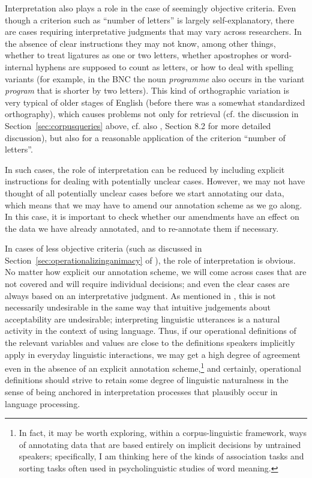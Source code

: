 Interpretation also plays a role in the case of seemingly objective criteria. Even though a criterion such as ``number of letters'' is largely self\hyp{}explanatory, there are cases requiring interpretative judgments that may vary across researchers. In the absence of clear instructions they may not know, among other things, whether to treat ligatures as one or two letters, whether apostrophes or word\hyp{}internal hyphens are supposed to count as letters, or how to deal with spelling variants (for example, in the BNC  the noun  \textit{programme} also occurs in the variant \textit{program} that is shorter by two letters). This kind of orthographic variation  is very typical of older stages of English (before there was a somewhat standardized orthography), which causes problems not only for retrieval  (cf. the discussion in Section~\ref{sec:corpusqueries}  above, cf. also \citet{barnbrook_language_1996}, Section 8.2 for more detailed discussion), but also for a reasonable application of the criterion ``number of letters''.

In such cases, the role of interpretation can be reduced by including explicit instructions for dealing with potentially unclear cases. However, we may not have thought of all potentially unclear cases before we start annotating  our data, which means that we may have to amend our annotation scheme as we go along. In this case, it is important to check whether our amendments have an effect on the data we have already annotated,  and to re\hyp{}annotate them if necessary.

In cases of less objective criteria (such as   discussed in
Section~\ref{sec:operationalizinganimacy} of ), the role of interpretation is obvious. No matter how explicit our annotation  scheme, we will come across cases that are not covered and will require individual decisions; and even the clear cases are always based on an interpretative judgment. As mentioned in , this is not necessarily undesirable in the same way that intuitive  judgements about acceptability  are undesirable; interpreting linguistic utterances is a natural activity in the context of using language. Thus, if our operational  definitions of the relevant variables and values are close to the definitions speakers implicitly apply in everyday linguistic interactions, we may get a high degree of agreement even in the absence of an explicit annotation  scheme,\footnote{In fact, it may be worth exploring, within a corpus\hyp{}linguistic framework, ways of annotating  data that are based entirely on implicit decisions by untrained speakers; specifically, I am thinking here of the kinds of association  tasks and sorting tasks often used in psycholinguistic  studies of word meaning.} and certainly, operational  definitions should strive to retain some degree of linguistic naturalness in the sense of being anchored in interpretation processes that plausibly occur in language processing.

